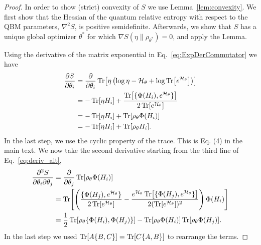 \documentclass[
    reprint,
    aps,
    prx,
    longbibliography
]{revtex4-2}
\begin{document}
\begin{proof}
In order to show (strict) convexity of $S$ we use Lemma~\ref{lem:convexity}. We first show that the Hessian of the quantum relative entropy with respect to the QBM parameters, $\nabla^2 S$, is positive semidefinite. Afterwards, we show that $S$ has a unique global optimizer $\theta^*$ for which $\nabla S(\eta \|\rho_{\theta^*})=0$, and apply the Lemma. 

Using the derivative of the matrix exponential in Eq.~\eqref{eq:ExpDerCommutator} we have
\begin{align}
\begin{split}
\label{eq:deriv_alt}
    \frac{\partial S}{\partial \theta_{i}} &= \frac{\partial}{\partial \theta_{i}} \Tr[ \eta \left( \log{\eta}-\mathcal{H}_\theta+\log \Tr[e^{\mathcal{H}_\theta} ] \right ) ] \\
    &= -\Tr[\eta H_{i}] + \frac{ \Tr[ \{\Phi(H_i), e^{\mathcal{H}_\theta} \} ] } {2 \Tr[e^{\mathcal{H}_\theta}] }  \\
    &= -\Tr[\eta H_{i}] +\Tr[\rho_\theta \Phi(H_{i})] \\
    &= -\Tr[\eta H_{i}] +\Tr[\rho_\theta H_{i}].
\end{split}
\end{align}
In the last step, we use the cyclic property of the trace. This is Eq. (4) in the main text.
We now take the second derivative starting from the third line of Eq.~\eqref{eq:deriv_alt}, 
\begin{align}
\begin{split}
\label{eq:hessian_new}
    \frac{\partial^2 S}{\partial \theta_{i} \partial \theta_{j}} &=  \frac{\partial}{\partial \theta_{j} } \Tr[\rho_\theta \Phi(H_{i})] \\
    &= \Tr[\left( \frac{ \{ \Phi(H_j), e^{\mathcal{H}_\theta} \} } {2 \Tr[e^{\mathcal{H}_\theta} ] }  - \frac{ e^{\mathcal{H}_\theta} \Tr[ \{ \Phi(H_j), e^{\mathcal{H}_\theta} \} ] } {2 (\Tr[e^{\mathcal{H}_\theta} ])^2} \right)  \Phi(H_{i}) ]\\
    &= \frac{1}{2} \Tr[ \rho_\theta \{ \Phi(H_i), \Phi(H_j) \}] - \Tr[ \rho_\theta \Phi(H_i)] \Tr[ \rho_\theta \Phi(H_j)] . 
\end{split}
\end{align} 
In the last step we used $\Tr[ A \{B, C\}] = \Tr[ C \{A, B\}]$ to rearrange the terms.


\end{proof}
\end{document}
